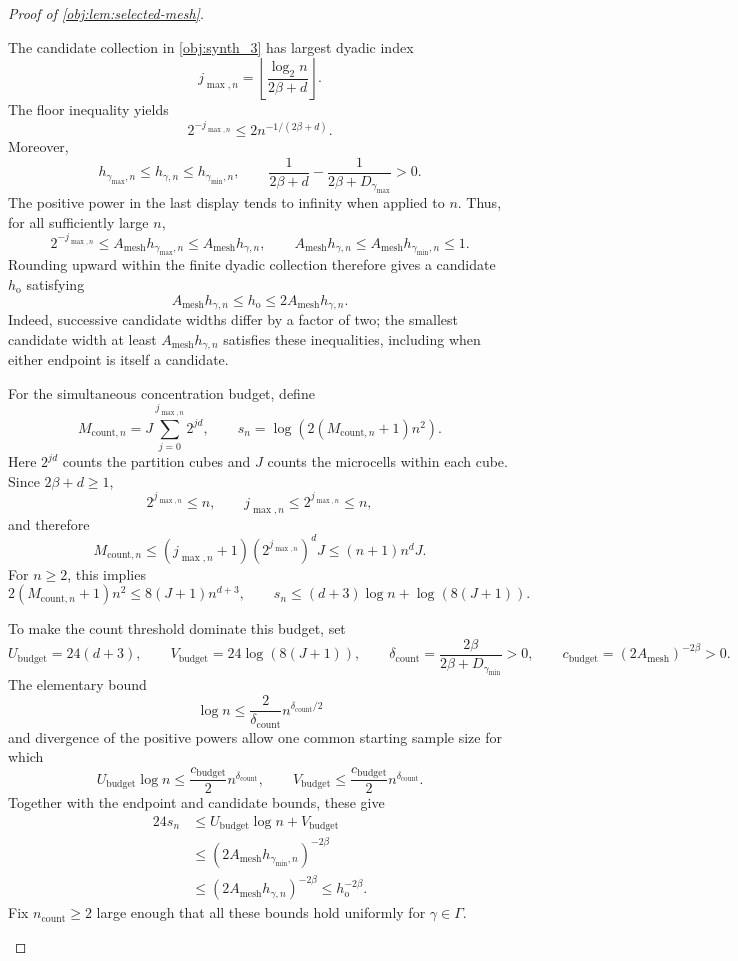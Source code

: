 \documentclass[11pt]{article}
\begin{document}
\begin{proof}[Proof of \cref{obj:lem:selected-mesh}]
\begin{enumerate}
The candidate collection in \cref{obj:synth_3} has largest dyadic index
\[
j_{\max,n}
=
\left\lfloor\frac{\log_2 n}{2\beta+d}\right\rfloor.
\]
The floor inequality yields
\[
2^{-j_{\max,n}}\le 2n^{-1/(2\beta+d)}.
\]
Moreover,
\[
h_{\gamma_{\max},n}\le h_{\gamma,n}
\le h_{\gamma_{\min},n},
\qquad
\frac1{2\beta+d}-\frac1{2\beta+D_{\gamma_{\max}}}>0.
\]
The positive power in the last display tends to infinity when applied to
\(n\). Thus, for all sufficiently large \(n\),
\[
2^{-j_{\max,n}}
\le A_{\mathrm{mesh}}h_{\gamma_{\max},n}
\le A_{\mathrm{mesh}}h_{\gamma,n},
\qquad
A_{\mathrm{mesh}}h_{\gamma,n}
\le A_{\mathrm{mesh}}h_{\gamma_{\min},n}\le1.
\]
Rounding upward within the finite dyadic collection therefore gives a
candidate \(h_{\mathrm{o}}\) satisfying
\[
A_{\mathrm{mesh}}h_{\gamma,n}
\le h_{\mathrm{o}}
\le2A_{\mathrm{mesh}}h_{\gamma,n}.
\]
Indeed, successive candidate widths differ by a factor of two; the
smallest candidate width at least
\(A_{\mathrm{mesh}}h_{\gamma,n}\) satisfies these inequalities, including
when either endpoint is itself a candidate.

For the simultaneous concentration budget, define
\[
M_{\mathrm{count},n}
=
J\sum_{j=0}^{j_{\max,n}}2^{jd},
\qquad
s_n=\log\!\left(2(M_{\mathrm{count},n}+1)n^2\right).
\]
Here \(2^{jd}\) counts the partition cubes and \(J\) counts the microcells
within each cube. Since \(2\beta+d\ge1\),
\[
2^{j_{\max,n}}\le n,\qquad
j_{\max,n}\le2^{j_{\max,n}}\le n,
\]
and therefore
\[
M_{\mathrm{count},n}
\le(j_{\max,n}+1)(2^{j_{\max,n}})^dJ
\le(n+1)n^dJ.
\]
For \(n\ge2\), this implies
\[
2(M_{\mathrm{count},n}+1)n^2
\le8(J+1)n^{d+3},
\qquad
s_n\le(d+3)\log n+\log(8(J+1)).
\]

To make the count threshold dominate this budget, set
\[
U_{\mathrm{budget}}=24(d+3),\qquad
V_{\mathrm{budget}}=24\log(8(J+1)),\qquad
\delta_{\mathrm{count}}
=\frac{2\beta}{2\beta+D_{\gamma_{\min}}}>0,
\qquad
c_{\mathrm{budget}}=(2A_{\mathrm{mesh}})^{-2\beta}>0.
\]
The elementary bound
\[
\log n\le\frac{2}{\delta_{\mathrm{count}}}
n^{\delta_{\mathrm{count}}/2}
\]
and divergence of the positive powers allow one common starting sample
size for which
\[
U_{\mathrm{budget}}\log n
\le\frac{c_{\mathrm{budget}}}{2}n^{\delta_{\mathrm{count}}},
\qquad
V_{\mathrm{budget}}
\le\frac{c_{\mathrm{budget}}}{2}n^{\delta_{\mathrm{count}}}.
\]
Together with the endpoint and candidate bounds, these give
\[
\begin{aligned}
24s_n
&\le U_{\mathrm{budget}}\log n+V_{\mathrm{budget}}\\
&\le(2A_{\mathrm{mesh}}h_{\gamma_{\min},n})^{-2\beta}\\
&\le(2A_{\mathrm{mesh}}h_{\gamma,n})^{-2\beta}
\le h_{\mathrm{o}}^{-2\beta}.
\end{aligned}
\]
Fix \(n_{\mathrm{count}}\ge2\) large enough that all these bounds hold
uniformly for \(\gamma\in\Gamma\).


\end{enumerate}
\end{proof}
\end{document}
